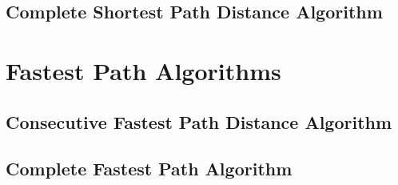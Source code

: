 \documentclass{article}
\theoremstyle{definition}
\numberwithin{thm}{subsection}
\begin{document}
\subsection{Complete Shortest Path Distance Algorithm}

\section{Fastest Path Algorithms}

\subsection{Consecutive Fastest Path Distance Algorithm}

\subsection{Complete Fastest Path Algorithm}
\end{document}
